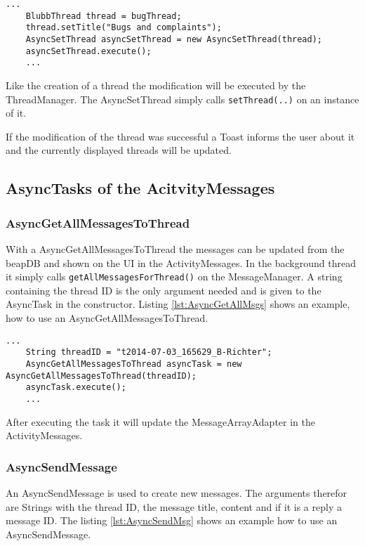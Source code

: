 \documentclass[12pt,a4paper,oneside]{report}
\newcommand{\code}[1]{\lstinline{#1}}
\begin{document}
\begin{lstlisting}[caption=AsyncSetThread example, label=lst:AsyncSetThread]
	...
	BlubbThread thread = bugThread;
	thread.setTitle("Bugs and complaints");
	AsyncSetThread asyncSetThread = new AsyncSetThread(thread);
	asyncSetThread.execute();
	...
\end{lstlisting}
Like the creation of a thread the modification will be executed by the ThreadManager. The AsyncSetThread simply calls \code{setThread(..)} on an instance of it.

If the modification of the thread was successful a Toast informs the user about it and the currently displayed threads will be updated.

\subsection{AsyncTasks of the AcitvityMessages}

\subsubsection{AsyncGetAllMessagesToThread} \label{subsubsec:AsyncGetAllMessagesToThread}
With a AsyncGetAllMessagesToThread the messages can be updated from the beapDB and shown on the UI in the ActivityMessages. In the background thread it simply calls \code{getAllMessagesForThread()} on the MessageManager. A string containing the thread ID is the only argument needed and is given to the AsyncTask in the constructor. Listing \ref{lst:AsyncGetAllMsgs} shows an example, how to use an AsyncGetAllMessagesToThread.
\begin{lstlisting}[caption=AsyncGetAllMessagesToThread example, label=lst:AsyncGetAllMsgs]
	...
	String threadID = "t2014-07-03_165629_B-Richter";
	AsyncGetAllMessagesToThread asyncTask = new AsyncGetAllMessagesToThread(threadID);
	asyncTask.execute();
	...
\end{lstlisting}

After executing the task it will update the MessageArrayAdapter in the ActivityMessages.

\subsubsection{AsyncSendMessage}
An AsyncSendMessage is used to create new messages. The arguments therefor are Strings with the thread ID, the message title, content and if it is a reply a message ID. The listing \ref{lst:AsyncSendMsg} shows an example how to use an AsyncSendMessage.
\end{document}
